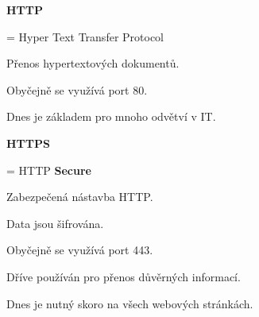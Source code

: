 \documentclass[aspectratio=169]{beamer}
\begin{document}
\begin{frame}
    \begin{multicols}{2}
        \centering
        
        \begin{cardTiny}
            \textbf{HTTP}
        
            \begin{flushleft}
            = Hyper Text Transfer Protocol

            \vspace{2ex}
            Přenos hypertextových dokumentů.

            Obyčejně se využívá port 80.
            
            \vspace{2ex}
            Dnes je základem pro mnoho odvětví v IT.
            \end{flushleft}
        \end{cardTiny}

        \begin{cardTiny}
            \textbf{HTTPS}
            
            \begin{flushleft}
            = HTTP \textbf{Secure}

            \vspace{2ex}
            Zabezpečená nástavba HTTP.
            
            Data jsou šifrována.

            Obyčejně se využívá port 443.
            
            \vspace{2ex}
            Dříve používán pro přenos důvěrných informací.

            Dnes je nutný skoro na všech webových stránkách.
            \end{flushleft}
        \end{cardTiny}
    \end{multicols}
\end{frame}
\end{document}
